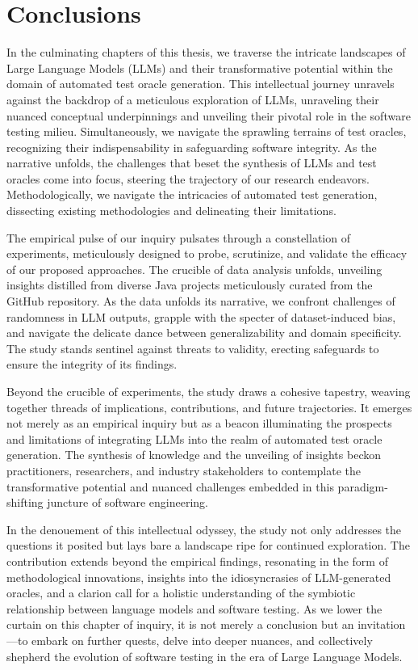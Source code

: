 \chapter{Conclusions}
\label{cha:conclusions}
\vspace{0.4 cm}

In the culminating chapters of this thesis, we traverse the intricate landscapes of Large Language Models (LLMs) and their transformative potential within the domain of automated test oracle generation. This intellectual journey unravels against the backdrop of a meticulous exploration of LLMs, unraveling their nuanced conceptual underpinnings and unveiling their pivotal role in the software testing milieu. Simultaneously, we navigate the sprawling terrains of test oracles, recognizing their indispensability in safeguarding software integrity. As the narrative unfolds, the challenges that beset the synthesis of LLMs and test oracles come into focus, steering the trajectory of our research endeavors. Methodologically, we navigate the intricacies of automated test generation, dissecting existing methodologies and delineating their limitations.

The empirical pulse of our inquiry pulsates through a constellation of experiments, meticulously designed to probe, scrutinize, and validate the efficacy of our proposed approaches. The crucible of data analysis unfolds, unveiling insights distilled from diverse Java projects meticulously curated from the GitHub repository. As the data unfolds its narrative, we confront challenges of randomness in LLM outputs, grapple with the specter of dataset-induced bias, and navigate the delicate dance between generalizability and domain specificity. The study stands sentinel against threats to validity, erecting safeguards to ensure the integrity of its findings.

Beyond the crucible of experiments, the study draws a cohesive tapestry, weaving together threads of implications, contributions, and future trajectories. It emerges not merely as an empirical inquiry but as a beacon illuminating the prospects and limitations of integrating LLMs into the realm of automated test oracle generation. The synthesis of knowledge and the unveiling of insights beckon practitioners, researchers, and industry stakeholders to contemplate the transformative potential and nuanced challenges embedded in this paradigm-shifting juncture of software engineering.

In the denouement of this intellectual odyssey, the study not only addresses the questions it posited but lays bare a landscape ripe for continued exploration. The contribution extends beyond the empirical findings, resonating in the form of methodological innovations, insights into the idiosyncrasies of LLM-generated oracles, and a clarion call for a holistic understanding of the symbiotic relationship between language models and software testing. As we lower the curtain on this chapter of inquiry, it is not merely a conclusion but an invitation—to embark on further quests, delve into deeper nuances, and collectively shepherd the evolution of software testing in the era of Large Language Models.

